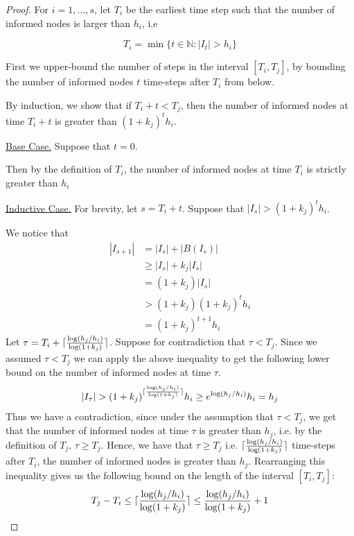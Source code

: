 \begin{proof}
	For $i = 1,\dots, s$, let $T_i$ be the earliest time step such that the number of informed nodes is larger than $h_i$, i.e

	$$
		T_i = \min \{ t \in \mathbb{N} : |I_t| > h_i \}
	$$

	First we upper-bound the number of steps in the interval $[T_i, T_j]$, %
	by bounding the number of informed nodes $t$ time-steps after $T_i$ from below.

	By induction, we show that if $T_i + t < T_j$, then the number of informed nodes at time $T_i + t$ is greater than $(1+k_j)^t h_i$.
	
	\underline{Base Case.} Suppose that $t=0$. 
	
	Then by the definition of $T_i$, the number of informed nodes at time $T_i$ is strictly greater than $h_i$

	\underline{Inductive Case.} For brevity, let $s = T_i + t$. Suppose that $|I_s| > (1+k_j)^t h_i$.

	We notice that 
	\begin{align*}
		|I_{s+1}| &= |I_s| + |B(I_s)| \\ %
		& \geq |I_s| + k_j |I_s| \\ %
		& = (1 + k_j)|I_s| \\
		& > (1 + k_j)(1+k_j)^t h_i \\ %
		& = (1+k_j)^{t+1} h_i
	\end{align*}
	Let $\tau = T_i + \lceil \frac{\log (h_j/h_i)}{\log(1+k_j)}\rceil$. 
	Suppose for contradiction that $\tau < T_j$. %
	Since we assumed $\tau < T_j$ we can apply the above inequality %
	to get the following lower bound on the number of informed nodes at time $\tau$.
	$$
		|I_\tau| > 
		(1+k_j)^{\lceil \frac{\log (h_j/h_i)}{\log(1+k_j)}\rceil} h_i
		\geq e^{\log (h_j/h_i)} h_i
		= h_j
	$$
	Thus we have a contradiction, since under the assumption that $\tau < T_j$, we get that the number of informed nodes at time $\tau$ is greater than $h_j$, i.e. by the definition of $T_j$, $\tau \geq T_j$. Hence, we have that $\tau \geq T_j$ i.e. $\lceil \frac{\log (h_j/h_i)}{\log(1+k_j)}\rceil$ time-steps after $T_i$, the number of informed nodes is greater than $h_j$. Rearranging this inequality gives us the following bound on the length of the interval $[T_i, T_j]$:
	\begin{equation} \label{eq:FloodingIntervalBound}
		T_j - T_i \leq \lceil \frac{\log (h_j/h_i)}{\log(1+k_j)}\rceil \leq \frac{\log (h_j/h_i)}{\log(1+k_j)} + 1
	\end{equation}


\end{proof}
